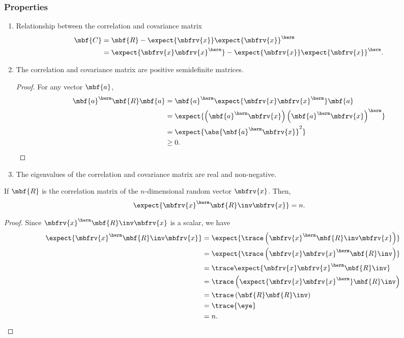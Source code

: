 \subsubsection*{Properties}
\begin{enumerate}
    \item Relationship between the correlation and covariance matrix
    \begin{align}
        \mbf{C} &= \mbf{R} - \expect{\mbfrv{x}}\expect{\mbfrv{x}}^{\herm}\\
        &= \expect{\mbfrv{x}\mbfrv{x}^{\herm}} - \expect{\mbfrv{x}}\expect{\mbfrv{x}}^{\herm}.
    \end{align}
    \item The correlation and covariance matrix are positive semidefinite matrices.
    \begin{proof}
        For any vector $\mbf{a}$, 
        \begin{align}
            \mbf{a}^{\herm}\mbf{R}\mbf{a} &= \mbf{a}^{\herm}\expect{\mbfrv{x}\mbfrv{x}^{\herm}}\mbf{a}\\
            &= \expect{\left(\mbf{a}^{\herm}\mbfrv{x}\right)\left(\mbf{a}^{\herm}\mbfrv{x}\right)^{\herm}}\\
            &= \expect{\abs{\mbf{a}^{\herm}\mbfrv{x}}^{2}}\\
            &\geq 0.
        \end{align}
    \end{proof}
    \item The eigenvalues of the correlation and covariance matrix are real and non-negative.
\end{enumerate}

\begin{mytheorem}       
       If $\mbf{R}$ is the correlation matrix of the $n$-dimensional random vector $\mbfrv{x}$. Then,
       \begin{align}
           \expect{\mbfrv{x}^{\herm}\mbf{R}\inv\mbfrv{x}} &= n.
       \end{align}
\end{mytheorem}
\begin{proof}
    Since $\mbfrv{x}^{\herm}\mbf{R}\inv\mbfrv{x}$ is a scalar, we have
    \begin{align}
        \expect{\mbfrv{x}^{\herm}\mbf{R}\inv\mbfrv{x}} &= \expect{\trace\left(\mbfrv{x}^{\herm}\mbf{R}\inv\mbfrv{x}\right)}\\
        &= \expect{\trace\left(\mbfrv{x}\mbfrv{x}^{\herm}\mbf{R}\inv\right)}\\
        &= \trace\expect{\mbfrv{x}\mbfrv{x}^{\herm}\mbf{R}\inv}\\
        &= \trace\left(\expect{\mbfrv{x}\mbfrv{x}^{\herm}}\mbf{R}\inv\right)\\
        &= \trace\left(\mbf{R}\mbf{R}\inv\right)\\
        &= \trace{\eye}\\
        &= n.
    \end{align}
\end{proof}

